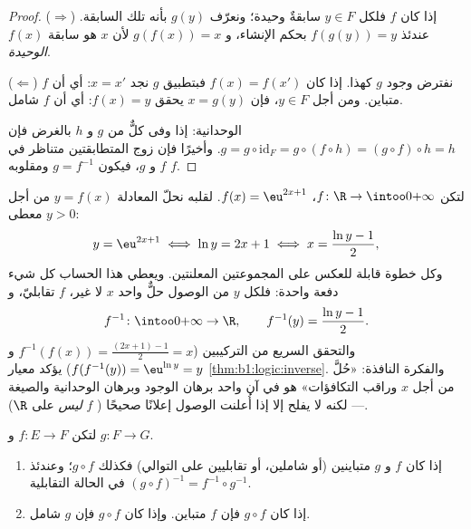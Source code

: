 \begin{proof}
($\Rightarrow$) إذا كان $f$  فلكل $y \in F$ سابقةٌ وحيدة؛
ونعرّف $g(y)$ بأنه تلك السابقة. عندئذ $f(g(y)) = y$ بحكم
الإنشاء، و $g(f(x)) = x$ لأن $x$ هو سابقة $f(x)$ \emph{الوحيدة}.

($\Leftarrow$) نفترض وجود $g$ كهذا. إذا كان $f(x) = f(x')$ فبتطبيق
$g$ نجد $x = x'$: أي أن $f$ متباين. ومن أجل $y \in F$، فإن $x = g(y)$
يحقق $f(x) = y$: أي أن $f$ شامل.

الوحدانية: إذا وفى كلٌّ من $g$ و $h$ بالغرض فإن $g = g \circ \mathrm{id}_F
= g \circ (f \circ h) = (g \circ f) \circ h = h$. وأخيرًا فإن زوج
المتطابقتين متناظر في $f$ و $g$، فيكون $g = f^{-1}$ 
ومقلوبه $f$.
\end{proof}

\begin{example}\label{ex:b1:logic:inversecomp}
لتكن $f \colon \R \to \intoo0{+\infty}$، $f(x) = \eu^{2x+1}$. لقلبه
نحلّ المعادلة $y = f(x)$ من أجل $y > 0$ معطى:
\[
y = \eu^{2x+1} \iff \ln y = 2x + 1 \iff x = \frac{\ln y - 1}2 ,
\]
وكل خطوة قابلة للعكس على المجموعتين المعلنتين. ويعطي هذا الحساب
كل شيء دفعة واحدة: فلكل $y$ من  الوصول حلٌّ واحد $x$ لا غير،  $f$ تقابليّ، و
\[
f^{-1} \colon \intoo0{+\infty} \to \R,
\qquad
f^{-1}(y) = \frac{\ln y - 1}2 .
\]
والتحقق السريع من التركيبين ($f^{-1}(f(x)) = \frac{(2x+1) -
1}2 = x$ و $f(f^{-1}(y)) = \eu^{\ln y} = y$) يؤكد
معيار \cref{thm:b1:logic:inverse}. والفكرة النافذة: «حُلَّ من أجل
$x$ وراقب التكافؤات» هو في آن واحد برهان الوجود وبرهان الوحدانية
والصيغة --- لكنه لا يفلح إلا إذا أُعلنت  الوصول إعلانًا
صحيحًا ( $f$ \emph{ليس}  على $\R$).
\end{example}

\begin{proposition}\label{prop:b1:logic:comp}
لتكن $f \colon E \to F$ و $g \colon F \to G$.
\begin{enumerate}
  \item إذا كان $f$ و $g$ متباينين (أو شاملين، أو تقابليين على
        التوالي) فكذلك $g \circ f$؛ وعندئذ $(g \circ f)^{-1} = f^{-1} \circ
        g^{-1}$ في الحالة التقابلية.
  \item إذا كان $g \circ f$  فإن $f$ متباين. وإذا كان
        $g \circ f$  فإن $g$ شامل.
\end{enumerate}
\end{proposition}

